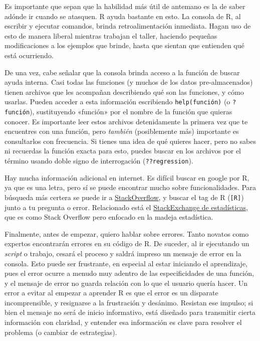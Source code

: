 \documentclass[
]{article}
\begin{document}
Es importante que sepan que la habilidad más útil de antemano es la de
saber adónde ir cuando se atasquen. R ayuda bastante en esto. La consola
de R, al escribir y ejecutar comandos, brinda retroalimentación
inmediata. Hagan uso de esto de manera liberal mientras trabajan el
taller, haciendo pequeñas modificaciones a los ejemplos que brinde,
hasta que sientan que entienden qué está ocurriendo.

De una vez, cabe señalar que la consola brinda acceso a la función de
buscar ayuda interna. Casi todas las funciones (y muchos de los datos
pre-almacenados) tienen archivos que les acompañan describiendo qué son
las funciones, y cómo usarlas. Pueden acceder a esta información
escribiendo \texttt{help(función)} (o \texttt{?función}), sustituyendo
«función» por el nombre de la función que quieras conocer. Es importante
leer estos archivos detenidamente la primera vez que te encuentres con
una función, pero \emph{también} (posiblemente más) importante es
consultarlos con frecuencia. Si tienes una idea de qué quieres hacer,
pero no sabes ni recuerdas la función exacta para esto, puedes buscar en
los archivos por el término usando doble signo de interrogación
(\texttt{??regression}).

Hay mucha información adicional en internet. Es difícil buscar en google
por R, ya que es una letra, pero sí se puede encontrar mucho sobre
funcionalidades. Para búsqueda más certera se puede ir a
\href{http://stackoverflow.com/}{StackOverflow}, y buscar el tag de R
(\texttt{{[}R{]}}) junto a tu pregunta o error. Relacionado está el
\href{http://stats.stackexchange.com/}{StackExchange de estadísticas},
que es como Stack Overflow pero enfocado en la madeja estadística.

Finalmente, antes de empezar, quiero hablar sobre errores. Tanto novatos
como expertos encontrarán errores en su código de R. De suceder, al ir
ejecutando un \emph{script} o trabajo, cesará el proceso y saldrá
impreso un mensaje de error en la consola. Esto puede ser frustrante, en
especial al estar iniciando el aprendizaje, pues el error ocurre a
menudo muy adentro de las especificidades de una función, y el mensaje
de error no guarda relación con lo que el usuario quería hacer. Un error
a evitar al empezar a aprender R es que el error es un disparate
incomprensible, y resignarse a la frustración y desánimo. Resistan ese
impulso; si bien el mensaje no será de inicio informativo, está diseñado
para transmitir cierta información con claridad, y entender esa
información es clave para resolver el problema (o cambiar de
estrategias).
\end{document}

